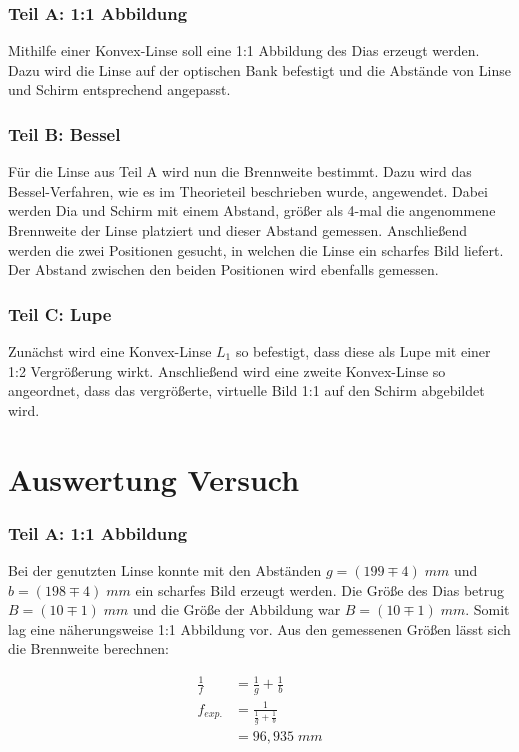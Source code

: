 \documentclass[a4paper]{scrartcl}
\numberwithin{equation}{subsection}
\begin{document}
\subsubsection{Teil A: 1:1 Abbildung}

Mithilfe einer Konvex-Linse soll eine 1:1 Abbildung des Dias erzeugt werden. Dazu wird die Linse auf der optischen Bank befestigt und die Abstände von Linse und Schirm entsprechend angepasst. 

\subsubsection{Teil B: Bessel}

Für die Linse aus Teil A wird nun die Brennweite bestimmt. Dazu wird das Bessel-Verfahren, wie es im Theorieteil beschrieben wurde, angewendet. Dabei werden Dia und Schirm mit einem Abstand, größer als 4-mal die angenommene Brennweite der Linse platziert und dieser Abstand gemessen. Anschließend werden die zwei Positionen gesucht, in welchen die Linse ein scharfes Bild liefert. Der Abstand zwischen den beiden Positionen wird ebenfalls gemessen.

\subsubsection{Teil C: Lupe}

Zunächst wird eine Konvex-Linse $L_1$ so befestigt, dass diese als Lupe mit einer 1:2 Vergrößerung wirkt. Anschließend wird eine zweite Konvex-Linse so angeordnet, dass das vergrößerte, virtuelle Bild 1:1 auf den Schirm abgebildet wird.

\newpage
\section{Auswertung Versuch}

\subsubsection{Teil A: 1:1 Abbildung}

Bei der genutzten Linse konnte mit den Abständen $g = (199 \mp 4) \;mm$ und $b = (198 \mp 4) \;mm$ ein scharfes Bild erzeugt werden.
Die Größe des Dias betrug $B = (10 \mp 1) \;mm$ und die Größe der Abbildung war $B = (10 \mp 1) \;mm$. Somit lag eine näherungsweise 1:1 Abbildung vor. 
Aus den gemessenen Größen lässt sich die Brennweite berechnen:

\begin{align}
\frac{1}{f} &= \frac{1}{g} + \frac{1}{b} \\
f_{\textit{exp.}} &= \frac{1}{\frac{1}{g} + \frac{1}{b}} \\
					&= 96,935 \;mm
\end{align}
\end{document}
